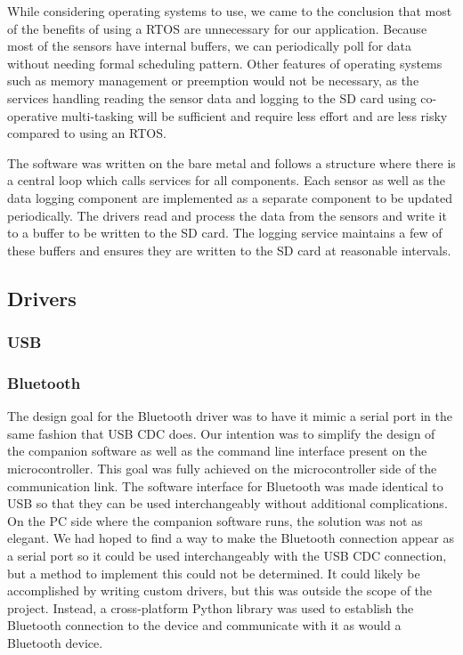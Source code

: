 While considering operating systems to use, we came to the conclusion 
that most of the benefits of using a RTOS 
are unnecessary for our application.
Because most of the sensors have internal buffers, we can periodically poll
for data without needing formal scheduling pattern. Other features of 
operating systems such as memory management or preemption would not be
necessary, as the services handling reading the sensor data and logging
to the SD card using co-operative multi-tasking will be sufficient and require
less effort and are less risky compared to using an RTOS.

The software was written on the bare metal and follows a structure where there
is a central loop which calls services for all components.  Each sensor as well
as the data logging component are implemented as a separate component
to be updated periodically. The drivers read and process the data from the
sensors and write it to a buffer to be written to the SD card. The logging service
maintains a few of these buffers and ensures they are written to the SD card
at reasonable intervals.

\subsection{Drivers}

\subsubsection{USB}

\subsubsection{Bluetooth}

The design goal for the Bluetooth driver was to have it mimic a serial
port in the same fashion that USB CDC does. Our intention was to 
simplify the design of the companion software as well as the command line 
interface present on the microcontroller. This goal was fully achieved 
on the microcontroller side of the communication link. The software interface for 
Bluetooth was made identical to USB so that they can be used interchangeably 
without additional complications. On the PC side where the companion software
runs, the solution was not as elegant. We had hoped to find a way to make the
Bluetooth connection appear as a serial port so it could be used interchangeably
with the USB CDC connection, but a method to implement this could not be determined. It 
could likely be accomplished by writing custom drivers, but this was outside the scope of the
project. Instead, a cross-platform Python library was used to establish the
Bluetooth connection to the device and communicate with it as would a Bluetooth device.

